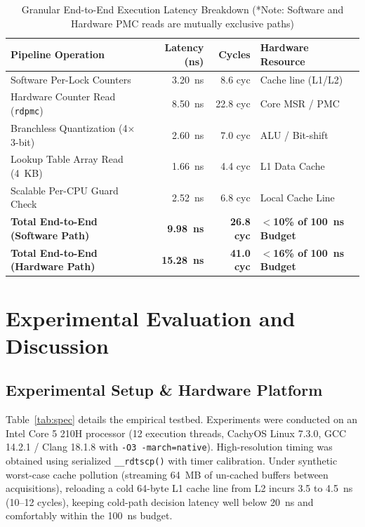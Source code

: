 \documentclass[conference]{IEEEtran}
\begin{document}
\begin{table}[t]
\centering
\caption{Granular End-to-End Execution Latency Breakdown (*Note: Software and Hardware PMC reads are mutually exclusive paths)}
\label{tab:breakdown}
\begin{tabular}{lrrl}
\toprule
\textbf{Pipeline Operation} & \textbf{Latency (ns)} & \textbf{Cycles} & \textbf{Hardware Resource} \\
\midrule
Software Per-Lock Counters & 3.20~ns & 8.6 cyc & Cache line (L1/L2) \\
Hardware Counter Read (\texttt{rdpmc}) & 8.50~ns & 22.8 cyc & Core MSR / PMC \\
Branchless Quantization (4$\times$3-bit) & 2.60~ns & 7.0 cyc & ALU / Bit-shift \\
Lookup Table Array Read (4~KB) & 1.66~ns & 4.4 cyc & L1 Data Cache \\
Scalable Per-CPU Guard Check & 2.52~ns & 6.8 cyc & Local Cache Line \\
\midrule
\textbf{Total End-to-End (Software Path)} & \textbf{9.98~ns} & \textbf{26.8 cyc} & \textbf{$<$10\% of 100~ns Budget} \\
\textbf{Total End-to-End (Hardware Path)} & \textbf{15.28~ns} & \textbf{41.0 cyc} & \textbf{$<$16\% of 100~ns Budget} \\
\bottomrule
\end{tabular}
\end{table}

\section{Experimental Evaluation and Discussion}

\subsection{Experimental Setup \& Hardware Platform}
Table~\ref{tab:spec} details the empirical testbed. Experiments were conducted on an Intel Core 5 210H processor (12 execution threads, CachyOS Linux 7.3.0, GCC 14.2.1 / Clang 18.1.8 with \texttt{-O3 -march=native}). High-resolution timing was obtained using serialized \texttt{\_\_rdtscp()} with timer calibration. Under synthetic worst-case cache pollution (streaming 64~MB of un-cached buffers between acquisitions), reloading a cold 64-byte L1 cache line from L2 incurs 3.5 to 4.5~ns (10--12 cycles), keeping cold-path decision latency well below 20~ns and comfortably within the 100~ns budget.
\end{document}
